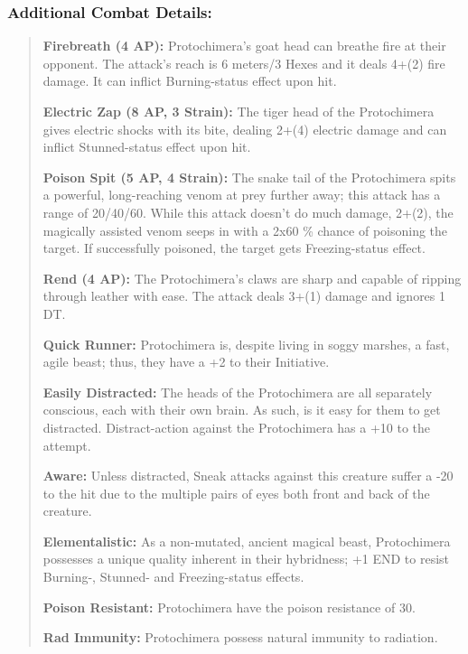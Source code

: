 \documentclass[11pt,a4paper,twocolumn]{book}
\begin{document}
	\subsubsection*{Additional Combat Details:}
	\begin{verse}
		\textbf{Firebreath (4 AP):} Protochimera's goat head can breathe fire at their opponent. The attack's reach is 6 meters/3 Hexes and it deals 4+(2) fire damage. It can inflict Burning-status effect upon hit.
		
		\textbf{Electric Zap (8 AP, 3 Strain):} The tiger head of the Protochimera gives electric shocks with its bite, dealing 2+(4) electric damage and can inflict Stunned-status effect upon hit.
	
		\textbf{Poison Spit (5 AP, 4 Strain):} The snake tail of the Protochimera spits a powerful, long-reaching venom at prey further away; this attack has a range of 20/40/60. While this attack doesn't do much damage, 2+(2), the magically assisted venom seeps in with a 2x60 \% chance of poisoning the target. If successfully poisoned, the target gets Freezing-status effect.
	
		\textbf{Rend (4 AP):} The Protochimera's claws are sharp and capable of ripping through leather with ease. The attack deals 3+(1) damage and ignores 1 DT.
	
		\textbf{Quick Runner:} Protochimera is, despite living in soggy marshes, a fast, agile beast; thus, they have a +2 to their Initiative.
	
		\textbf{Easily Distracted:} The heads of the Protochimera are all separately conscious, each with their own brain. As such, is it easy for them to get distracted. Distract-action against the Protochimera has a +10 to the attempt.
		
		\textbf{Aware:} Unless distracted, Sneak attacks against this creature suffer a -20 to the hit due to the multiple pairs of eyes both front and back of the creature.
	
		\textbf{Elementalistic:} As a non-mutated, ancient magical beast, Protochimera possesses a unique quality inherent in their hybridness; +1 END to resist Burning-, Stunned- and Freezing-status effects.
	
		\textbf{Poison Resistant:} Protochimera have the poison resistance of 30.
		
		\textbf{Rad Immunity:} Protochimera possess natural immunity to radiation.
		
	\end{verse}
\end{document}
